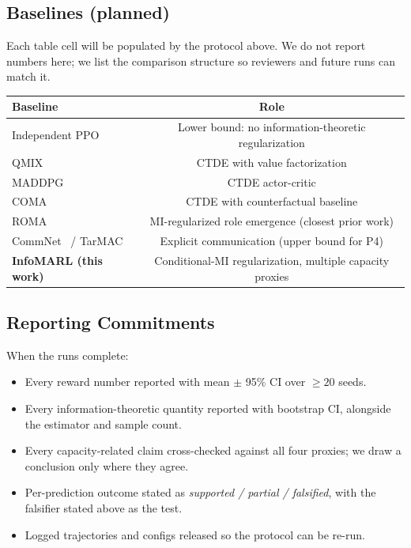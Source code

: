 \documentclass[10pt, letterpaper]{article}
\begin{document}
\subsection{Baselines (planned)}

Each table cell will be populated by the protocol above. We do not report numbers here; we list the comparison structure so reviewers and future runs can match it.

\begin{center}
\begin{tabular}{lc}
\toprule
\textbf{Baseline} & \textbf{Role} \\
\midrule
Independent PPO~\cite{schulman2017ppo} & Lower bound: no information-theoretic regularization \\
QMIX~\cite{rashid2018qmix} & CTDE with value factorization \\
MADDPG~\cite{lowe2017maddpg} & CTDE actor-critic \\
COMA~\cite{foerster2018coma} & CTDE with counterfactual baseline \\
ROMA~\cite{wang2020roma} & MI-regularized role emergence (closest prior work) \\
CommNet~\cite{sukhbaatar2016} / TarMAC~\cite{das2019tarmac} & Explicit communication (upper bound for P4) \\
\textbf{InfoMARL (this work)} & Conditional-MI regularization, multiple capacity proxies \\
\bottomrule
\end{tabular}
\end{center}

\subsection{Reporting Commitments}

When the runs complete:
\begin{itemize}
    \item Every reward number reported with mean $\pm$ 95\% CI over $\geq 20$ seeds.
    \item Every information-theoretic quantity reported with bootstrap CI, alongside the estimator and sample count.
    \item Every capacity-related claim cross-checked against all four proxies; we draw a conclusion only where they agree.
    \item Per-prediction outcome stated as \emph{supported / partial / falsified}, with the falsifier stated above as the test.
    \item Logged trajectories and configs released so the protocol can be re-run.
\end{itemize}
\end{document}
